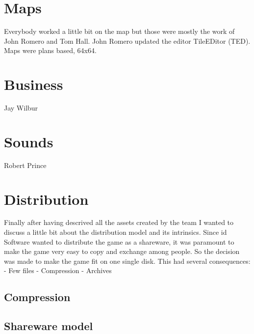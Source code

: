 \documentclass[book.tex]{subfiles}
\begin{document}
\section{Maps}
Everybody worked a little bit on the map but those were mostly the work of John Romero and Tom Hall. John Romero updated the editor TileEDitor (TED). Maps were plans based, 64x64.
\section{Business}
Jay Wilbur
\section{Sounds}
Robert Prince
\section{Distribution}
Finally after having descrived all the assets created by the team I wanted to discuss a little bit about the distribution model and its intrinsics. Since id Software wanted to distribute the game as a shareware, it was paramount to make the game very easy to copy and exchange among people. So the decision was made to make the game fit on one single disk. This had several consequences:
- Few files
- Compression
- Archives
	\subsection{Compression}
	\subsection{Shareware model}
\end{document}
